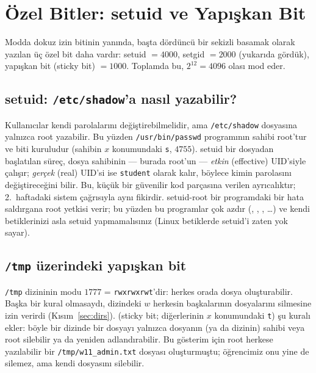 \section{Özel Bitler: setuid ve Yapışkan Bit}
\label{sec:special}

Modda dokuz izin bitinin yanında, başta dördüncü bir sekizli basamak olarak yazılan üç özel bit daha vardır: setuid $= 4000$, setgid $= 2000$ (yukarıda gördük), yapışkan bit (sticky bit) $= 1000$. Toplamda bu, $2^{12} = 4096$ olası mod eder.

\subsection{setuid:  \texttt{/etc/shadow}'a nasıl yazabilir?}



Kullanıcılar kendi parolalarını değiştirebilmelidir, ama \texttt{/etc/shadow} dosyasına yalnızca root yazabilir. Bu yüzden \texttt{/usr/bin/passwd} programının sahibi root'tur ve  biti kuruludur (sahibin $x$ konumundaki \texttt{s}, $4755$). setuid bir dosyadan başlatılan süreç, dosya sahibinin --- burada root'un --- \emph{etkin} (effective) UID'siyle çalışır; \emph{gerçek} (real) UID'si ise \texttt{student} olarak kalır, böylece  kimin parolasını değiştireceğini bilir. Bu, küçük bir güvenilir kod parçasına verilen ayrıcalıktır; 2.~haftadaki sistem çağrısıyla aynı fikirdir. setuid-root bir programdaki bir hata saldırgana root yetkisi verir; bu yüzden bu programlar çok azdır (, , , \dots) ve kendi betiklerinizi asla setuid yapmamalısınız (Linux betiklerde setuid'i zaten yok sayar).

\subsection{\texttt{/tmp} üzerindeki yapışkan bit}



\texttt{/tmp} dizininin modu $1777$ = \texttt{rwxrwxrwt}'dir: herkes orada dosya oluşturabilir. Başka bir kural olmasaydı, dizindeki $w$ herkesin başkalarının dosyalarını silmesine izin verirdi (Kısım~\ref{sec:dirs}).  (sticky bit; diğerlerinin $x$ konumundaki \texttt{t}) şu kuralı ekler: böyle bir dizinde bir dosyayı yalnızca dosyanın (ya da dizinin) sahibi veya root silebilir ya da yeniden adlandırabilir. Bu gösterim için root herkese yazılabilir bir \texttt{/tmp/w11\_admin.txt} dosyası oluşturmuştu; öğrencimiz onu yine de silemez, ama kendi dosyasını silebilir.

